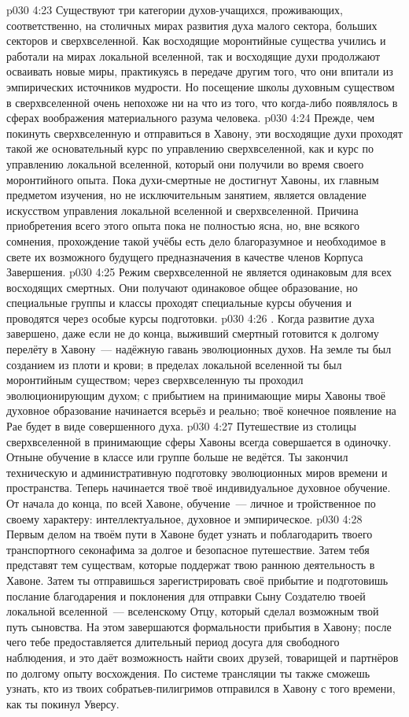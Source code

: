 \vs p030 4:23 Существуют три категории духов\hyp{}учащихся, проживающих, соответственно, на столичных мирах развития духа малого сектора, больших секторов и сверхвселенной. Как восходящие моронтийные существа учились и работали на мирах локальной вселенной, так и восходящие духи продолжают осваивать новые миры, практикуясь в передаче другим того, что они впитали из эмпирических источников мудрости. Но посещение школы духовным существом в сверхвселенной очень непохоже ни на что из того, что когда\hyp{}либо появлялось в сферах воображения материального разума человека.
\vs p030 4:24 Прежде, чем покинуть сверхвселенную и отправиться в Хавону, эти восходящие духи проходят такой же основательный курс по управлению сверхвселенной, как и курс по управлению локальной вселенной, который они получили во время своего моронтийного опыта. Пока духи\hyp{}смертные не достигнут Хавоны, их главным предметом изучения, но не исключительным занятием, является овладение искусством управления локальной вселенной и сверхвселенной. Причина приобретения всего этого опыта пока не полностью ясна, но, вне всякого сомнения, прохождение такой учёбы есть дело благоразумное и необходимое в свете их возможного будущего предназначения в качестве членов Корпуса Завершения.
\vs p030 4:25 Режим сверхвселенной не является одинаковым для всех восходящих смертных. Они получают одинаковое общее образование, но специальные группы и классы проходят специальные курсы обучения и проводятся через особые курсы подготовки.
\vs p030 4:26 . Когда развитие духа завершено, даже если не до конца, выживший смертный готовится к долгому перелёту в Хавону~--- надёжную гавань эволюционных духов. На земле ты был созданием из плоти и крови; в пределах локальной вселенной ты был моронтийным существом; через сверхвселенную ты проходил эволюционирующим духом; с прибытием на принимающие миры Хавоны твоё духовное образование начинается всерьёз и реально; твоё конечное появление на Рае будет в виде совершенного духа.
\vs p030 4:27 Путешествие из столицы сверхвселенной в принимающие сферы Хавоны всегда совершается в одиночку. Отныне обучение в классе или группе больше не ведётся. Ты закончил техническую и административную подготовку эволюционных миров времени и пространства. Теперь начинается твоё  твоё индивидуальное духовное обучение. От начала до конца, по всей Хавоне, обучение~--- личное и тройственное по своему характеру: интеллектуальное, духовное и эмпирическое.
\vs p030 4:28 Первым делом на твоём пути в Хавоне будет узнать и поблагодарить твоего транспортного секонафима за долгое и безопасное путешествие. Затем тебя представят тем существам, которые поддержат твою раннюю деятельность в Хавоне. Затем ты отправишься зарегистрировать своё прибытие и подготовишь послание благодарения и поклонения для отправки Сыну Создателю твоей локальной вселенной~--- вселенскому Отцу, который сделал возможным твой путь сыновства. На этом завершаются формальности прибытия в Хавону; после чего тебе предоставляется длительный период досуга для свободного наблюдения, и это даёт возможность найти своих друзей, товарищей и партнёров по долгому опыту восхождения. По системе трансляции ты также сможешь узнать, кто из твоих собратьев\hyp{}пилигримов отправился в Хавону с того времени, как ты покинул Уверсу.
